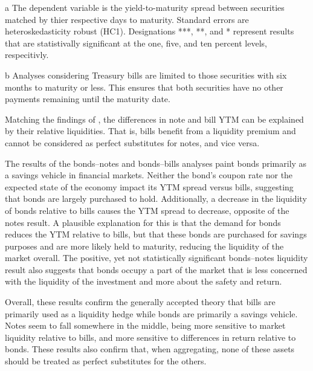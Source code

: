 \documentclass[11pt,a4paper,margin=1.5in]{article}
\begin{document}
\begin{table}[p]
\begin{threeparttable}
\begin{tabular}{l d{2.4} d{2.4} d{2.4}}
		\end{tabular}
		\begin{tablenotes}
			\item[a] \footnotesize{The dependent variable is the yield-to-maturity spread between securities matched by thier respective days to maturity. Standard errors are heteroskedasticity robust (HC1). Designations ***, **, and * represent results that are statistivally significant at the one, five, and ten percent levels, respecitivly.}
			\item[b] \footnotesize{Analyses considering Treasury bills are limited to those securities with six months to maturity or less. This ensures that both securities have no other payments remaining until the maturity date.}
		\end{tablenotes}
	\end{threeparttable}
\end{table}

Matching the findings of \citet{Amihud-Mendelson:1991}, the differences in note and bill YTM can be explained by their relative liquidities.
That is, bills benefit from a liquidity premium and cannot be considered as perfect substitutes for notes, and vice versa.

The results of the bonds--notes and bonds--bills analyses paint bonds primarily as a savings vehicle in financial markets. 
Neither the bond's coupon rate nor the expected state of the economy impact its YTM spread versus bills, suggesting that bonds are largely purchased to hold.
Additionally, a decrease in the liquidity of bonds relative to bills causes the YTM spread to decrease, opposite of the notes result. 
A plausible explanation for this is that the demand for bonds reduces the YTM relative to bills, but that these bonds are purchased for savings purposes and are more likely held to maturity, reducing the liquidity of the market overall.
The positive, yet not statistically significant bonds--notes liquidity result also suggests that bonds occupy a part of the market that is less concerned with the liquidity of the investment and more about the safety and return.


Overall, these results confirm the generally accepted theory that bills are primarily used as a liquidity hedge while bonds are primarily a savings vehicle.
Notes seem to fall somewhere in the middle, being more sensitive to market liquidity relative to bills, and more sensitive to differences in return relative to bonds.
These results also confirm that, when aggregating, none of these assets should be treated as perfect substitutes for the others.
\end{document}
